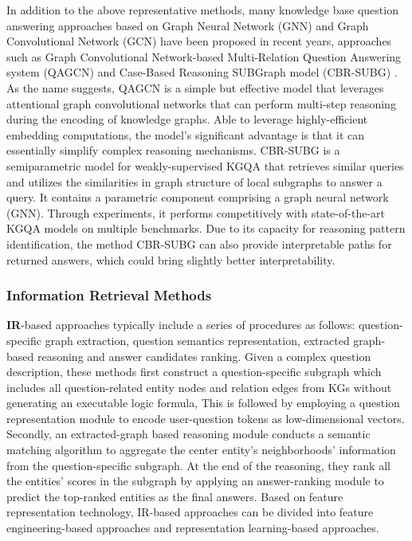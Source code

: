 \documentclass[pdflatex,sn-mathphys]{sn-jnl}%
\theoremstyle{thmstyleone}%
\theoremstyle{thmstyletwo}%
\theoremstyle{thmstylethree}%
\begin{document}
\textcolor[rgb]{1,0,0}{In addition to the above representative methods, many knowledge base question answering approaches based on Graph Neural Network (GNN) \cite{linetal} and Graph Convolutional Network (GCN) \cite{QCNpaper} have been proposed in recent years, approaches such as Graph Convolutional Network-based Multi-Relation Question Answering system (QAGCN) \cite{wangQAGCN} and Case-Based Reasoning SUBGraph model (CBR-SUBG) \cite{pmlrv162das22a}. As the name suggests, QAGCN is a simple but effective model that leverages attentional graph convolutional networks that can perform multi-step reasoning during the encoding of knowledge graphs. Able to leverage highly-efficient embedding computations, the model's significant advantage is that it can essentially simplify complex reasoning mechanisms. CBR-SUBG is a semiparametric model for weakly-supervised KGQA that retrieves similar queries and utilizes the similarities in graph structure of local subgraphs to answer a query. It contains a parametric component comprising a graph neural network (GNN). Through experiments, it performs competitively with state-of-the-art KGQA models on multiple benchmarks. Due to its capacity for reasoning pattern identification, the method CBR-SUBG can also provide interpretable paths for returned answers, which could bring slightly better interpretability.}


\subsubsection{Information Retrieval Methods} \textbf{IR}-based approaches typically include a series of procedures as follows: question-specific graph extraction, question semantics representation, extracted graph-based reasoning and answer candidates ranking. Given a complex question description, these methods \cite{chen2019uhopKGQA,jain2016fmnKGQA} first construct a question-specific subgraph which includes all question-related entity nodes and relation edges from KGs without generating an executable logic formula, This is followed by employing a question representation module to encode user-question tokens as low-dimensional vectors. Secondly, an extracted-graph based reasoning module conducts a semantic matching algorithm to aggregate the center entity's neighborhoods' information from the question-specific subgraph. At the end of the reasoning, they rank all the entities' scores in the subgraph by applying an answer-ranking module to predict the top-ranked entities as the final answers. Based on feature representation technology, IR-based approaches can be divided into feature engineering-based approaches and representation learning-based approaches. 
\end{document}

